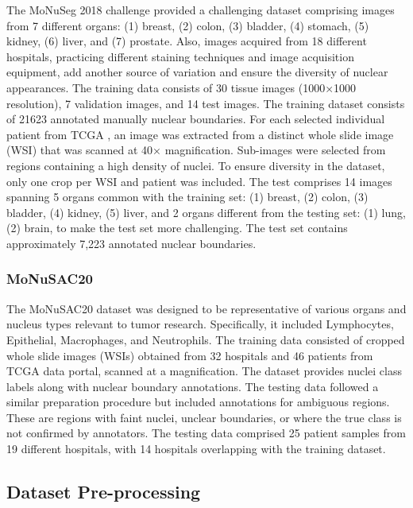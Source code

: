 \documentclass{article}
\begin{document}
The MoNuSeg 2018 challenge provided a challenging dataset \cite{kumar2019multi} comprising images from 7 different organs: (1) breast, (2) colon, (3) bladder, (4) stomach, (5) kidney, (6) liver, and (7) prostate. Also, images acquired from 18 different hospitals, practicing different staining techniques and image acquisition equipment, add another source of variation and ensure the diversity of nuclear appearances. The training data consists of 30 tissue images (1000×1000 resolution), 7 validation images, and 14 test images. The training dataset consists of 21623 annotated manually nuclear boundaries. For each selected individual patient from TCGA \cite{tcga}, an image was extracted from a distinct whole slide image (WSI) that was scanned at 40× magnification. Sub-images were selected from regions containing a high density of nuclei. To ensure diversity in the dataset, only one crop per WSI and patient was included. The test comprises 14 images spanning 5 organs common with the training set: (1) breast, (2) colon, (3) bladder, (4) kidney, (5) liver, and 2 organs different from the testing set: (1) lung, (2) brain, to make the test set more challenging. The test set contains approximately 7,223 annotated nuclear boundaries.

\subsubsection{MoNuSAC20}

The MoNuSAC20 dataset \cite{verma2021monusac2020} was designed to be representative of various organs and nucleus types relevant to tumor research. Specifically, it included Lymphocytes, Epithelial, Macrophages, and Neutrophils. The training data consisted of cropped whole slide images (WSIs) obtained from 32 hospitals and 46 patients from TCGA \cite{tcga} data portal, scanned at a  magnification. The dataset provides nuclei class labels along with nuclear boundary annotations. The testing data followed a similar preparation procedure but included annotations for ambiguous regions. These are regions with faint nuclei, unclear boundaries, or where the true class is not confirmed by annotators. The testing data comprised 25 patient samples from 19 different hospitals, with 14 hospitals overlapping with the training dataset.

\subsection{Dataset Pre-processing}\label{Dataset Pre-processing}
\end{document}
